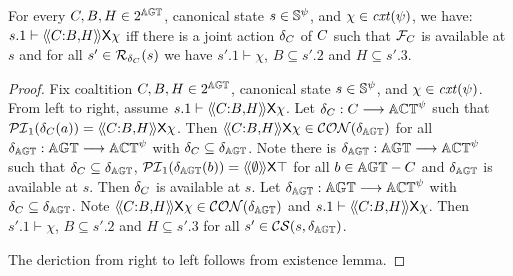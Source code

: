 \begin{theorem}
For every $C,B,H\in2^{\mathbb{AGT}}$, 
canonical state $s\in \mathbb{S}^\psi$, 
and $\chi \in \mathit{cxt}(\psi )$, 
we have: $s.1\vdash \langle\!\langle C{:}B{,}H  \rangle\!\rangle\mathsf{X}\chi $ iff 
there is a joint action $\delta_C$ of $C$ such that 
$\mathcal{F}_C $ is available at $s$ and 
for all $s'\in \mathcal{R}_{\delta_C}(s)$ we have 
$s'.1\vdash \chi $, $B\subseteq s'.2$ and $H\subseteq s'.3$.
\end{theorem}
\begin{proof}
    Fix coaltition $C,B,H\in2^{\mathbb{AGT}}$, 
canonical state $s\in \mathbb{S}^\psi$, 
and $\chi \in \mathit{cxt}(\psi )$.  From left to right, assume $s.1\vdash \langle\!\langle C{:}B{,}H  \rangle\!\rangle\mathsf{X}\chi $. Let $\delta_C: C \longrightarrow \mathbb{ACT}^\psi$ such that $\mathcal{PI}_1(\delta_C(a))=\langle\!\langle C{:}B{,}H  \rangle\!\rangle\mathsf{X}\chi $. Then $\langle\!\langle C{:}B{,}H  \rangle\!\rangle\mathsf{X}\chi \in\mathcal{CON}(\delta_{\mathbb{AGT}})$ for all $\delta_{\mathbb{AGT}}:\mathbb{AGT}\longrightarrow \mathbb{ACT}^\psi$ with $\delta_C \subseteq \delta_{\mathbb{AGT}} $. Note there is $\delta_{\mathbb{AGT}}:\mathbb{AGT}\longrightarrow \mathbb{ACT}^\psi $ such that $\delta_C \subseteq \delta_{\mathbb{AGT}} $, $\mathcal{PI}_1(\delta_{\mathbb{AGT}} (b))= \langle\!\langle \emptyset \rangle\!\rangle\mathsf{X}\top$ for all $b\in\mathbb{AGT}-C$ and $\delta_{\mathbb{AGT}} $ is available at $s$.    
    Then $\delta_C$ is available at $s$. Let $\delta_{\mathbb{AGT}}:\mathbb{AGT}\longrightarrow \mathbb{ACT}^\psi$ with $\delta_C \subseteq \delta_{\mathbb{AGT}} $. Note $\langle\!\langle C{:}B{,}H  \rangle\!\rangle\mathsf{X}\chi \in\mathcal{CON}(\delta_{\mathbb{AGT}})$ and $s.1\vdash \langle\!\langle C{:}B{,}H  \rangle\!\rangle\mathsf{X}\chi $. Then $s'.1\vdash \chi $, $B\subseteq s'.2$ and $H\subseteq s'.3$ for all $s'\in \mathcal{CS}(s,\delta_{\mathbb{AGT}} )$.

    The deriction from right to left follows from existence lemma.
  \end{proof}

